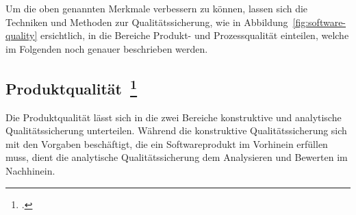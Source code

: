Um die oben genannten Merkmale verbessern zu können, lassen sich die Techniken und Methoden zur Qualitätssicherung, wie in Abbildung~\ref{fig:software-quality} ersichtlich, in die Bereiche Produkt- und Prozessqualität einteilen, welche im Folgenden noch genauer beschrieben werden.

\subsection[Produktqualität]{Produktqualität~\footcite[vgl.][Kapitel 1.4.1]{hoffmann_software_qualitat_2013}}

Die Produktqualität lässt sich in die zwei Bereiche konstruktive und analytische Qualitätssicherung unterteilen.
Während die konstruktive Qualitätssicherung sich mit den Vorgaben beschäftigt, die ein Softwareprodukt im Vorhinein erfüllen muss, dient die analytische Qualitätssicherung dem Analysieren und Bewerten im Nachhinein.

